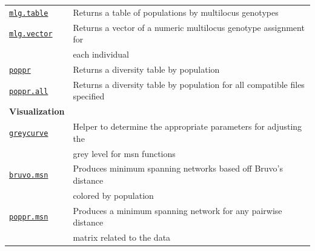 \documentclass[letterpaper]{article}\usepackage[]{graphicx}\usepackage[]{color}
\begin{document}
\begin{table}[ht]
\begin{tabular}{ll}
\texttt{\hyperref[mlg:table:mlg.table]{mlg.table}} & Returns a table of populations by multilocus genotypes \\
\texttt{\hyperref[mlg:mix:mlg.vector]{mlg.vector}} & Returns a vector of a numeric multilocus genotype assignment for \\ 
 & each individual \\
\texttt{\hyperref[summary:poppr]{poppr}} & Returns a diversity table by population \\
\texttt{\hyperref[summary:poppr]{poppr.all}} & Returns a diversity table by population for all compatible files specified \\
\hline
\textbf{Visualization} & \\
\texttt{\hyperref[index:trees:greycurve]{greycurve}} & Helper to determine the appropriate parameters for adjusting the\\
 & grey level for msn functions \\
\texttt{\hyperref[index:trees:bruvo.msn]{bruvo.msn}} & Produces minimum spanning networks based off Bruvo's distance\\
 & colored by population \\
\texttt{\hyperref[index:trees:poppr.msn]{poppr.msn}} & Produces a minimum spanning network for any pairwise distance\\  
 & matrix related to the data \\
\hline
\end{tabular}
\end{table}

\newpage



\end{document}
